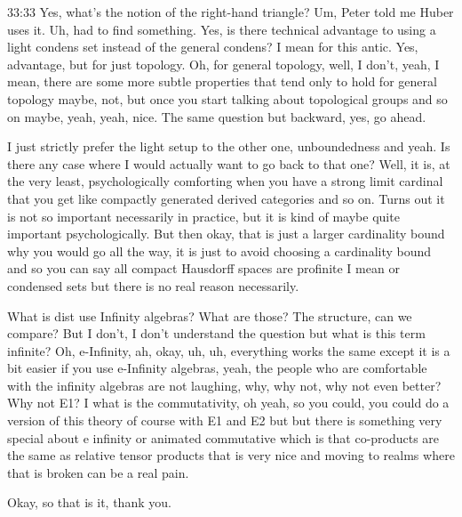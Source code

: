 \begin{unfinished}{33:33}
Yes, what's the notion of the right-hand triangle? Um, Peter told me Huber uses it. Uh, had to find something. Yes, is there technical advantage to using a light condens set instead of the general condens? I mean for this antic. Yes, advantage, but for just topology. Oh, for general topology, well, I don't, yeah, I mean, there are some more subtle properties that tend only to hold for general topology maybe, not, but once you start talking about topological groups and so on maybe, yeah, yeah, nice. The same question but backward, yes, go ahead.

I just strictly prefer the light setup to the other one, unboundedness and yeah. Is there any case where I would actually want to go back to that one? Well, it is, at the very least, psychologically comforting when you have a strong limit cardinal that you get like compactly generated derived categories and so on. Turns out it is not so important necessarily in practice, but it is kind of maybe quite important psychologically. But then okay, that is just a larger cardinality bound why you would go all the way, it is just to avoid choosing a cardinality bound and so you can say all compact Hausdorff spaces are profinite I mean or condensed sets but there is no real reason necessarily.

What is dist use Infinity algebras? What are those? The structure, can we compare? But I don't, I don't understand the question but what is this term infinite? Oh, e-Infinity, ah, okay, uh, uh, everything works the same except it is a bit easier if you use e-Infinity algebras, yeah, the people who are comfortable with the infinity algebras are not laughing, why, why not, why not even better? Why not E1? I what is the commutativity, oh yeah, so you could, you could do a version of this theory of course with E1 and E2 but but there is something very special about e infinity or animated commutative which is that co-products are the same as relative tensor products that is very nice and moving to realms where that is broken can be a real pain.

Okay, so that is it, thank you.
\end{unfinished}